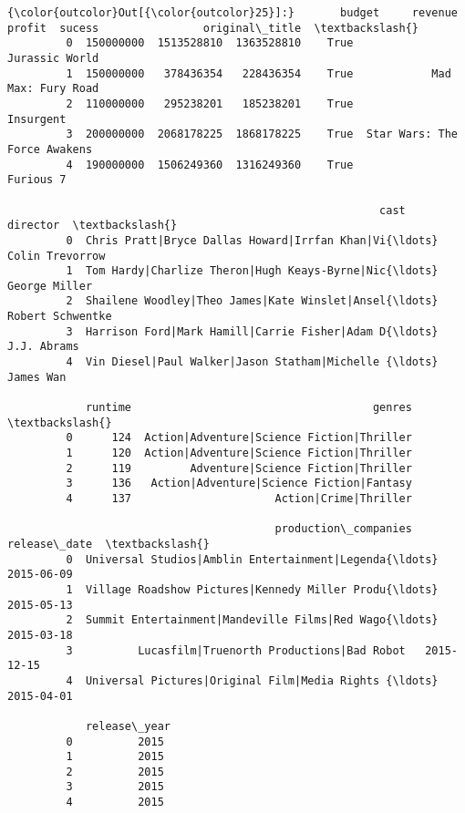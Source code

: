 \documentclass[11pt]{article}
\begin{document}
\begin{Verbatim}[commandchars=\\\{\}]
{\color{outcolor}Out[{\color{outcolor}25}]:}       budget     revenue      profit  sucess                original\_title  \textbackslash{}
         0  150000000  1513528810  1363528810    True                Jurassic World   
         1  150000000   378436354   228436354    True            Mad Max: Fury Road   
         2  110000000   295238201   185238201    True                     Insurgent   
         3  200000000  2068178225  1868178225    True  Star Wars: The Force Awakens   
         4  190000000  1506249360  1316249360    True                     Furious 7   
         
                                                         cast          director  \textbackslash{}
         0  Chris Pratt|Bryce Dallas Howard|Irrfan Khan|Vi{\ldots}   Colin Trevorrow   
         1  Tom Hardy|Charlize Theron|Hugh Keays-Byrne|Nic{\ldots}     George Miller   
         2  Shailene Woodley|Theo James|Kate Winslet|Ansel{\ldots}  Robert Schwentke   
         3  Harrison Ford|Mark Hamill|Carrie Fisher|Adam D{\ldots}       J.J. Abrams   
         4  Vin Diesel|Paul Walker|Jason Statham|Michelle {\ldots}         James Wan   
         
            runtime                                     genres  \textbackslash{}
         0      124  Action|Adventure|Science Fiction|Thriller   
         1      120  Action|Adventure|Science Fiction|Thriller   
         2      119         Adventure|Science Fiction|Thriller   
         3      136   Action|Adventure|Science Fiction|Fantasy   
         4      137                      Action|Crime|Thriller   
         
                                         production\_companies release\_date  \textbackslash{}
         0  Universal Studios|Amblin Entertainment|Legenda{\ldots}   2015-06-09   
         1  Village Roadshow Pictures|Kennedy Miller Produ{\ldots}   2015-05-13   
         2  Summit Entertainment|Mandeville Films|Red Wago{\ldots}   2015-03-18   
         3          Lucasfilm|Truenorth Productions|Bad Robot   2015-12-15   
         4  Universal Pictures|Original Film|Media Rights {\ldots}   2015-04-01   
         
            release\_year  
         0          2015  
         1          2015  
         2          2015  
         3          2015  
         4          2015  
\end{Verbatim}
            
\end{document}
